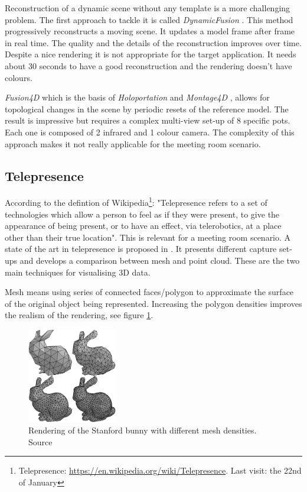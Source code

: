 Reconstruction of a dynamic scene without any template is a more challenging problem. The first approach to tackle it is called \textit{DynamicFusion} \cite{zollhofer_real-time_2014}. This method progressively reconstructs a moving scene. It updates a model frame after frame in real time. The quality and the details of the reconstruction improves over time. Despite a nice rendering it is not appropriate for the target application. It needs about 30 seconds to have a good reconstruction and the rendering doesn't have colours. 

\textit{Fusion4D} \cite{dou_fusion4d:_2016} which is the basis of \textit{Holoportation} \cite{orts-escolano_holoportation_2016} and \textit{Montage4D} \cite{du_montage4d:_2019}, allows for topological changes in the scene by periodic resets of the reference model. The result is impressive but requires a complex multi-view set-up of 8 specific pots. Each one is composed of 2 infrared and 1 colour camera. The complexity of this approach makes it not really applicable for the meeting room scenario.


\subsection{Telepresence}

According to the defintion of Wikipedia\footnote{Telepresence: \url{https://en.wikipedia.org/wiki/Telepresence}. Last visit: the 22nd of January}: "Telepresence refers to a set of technologies which allow a person to feel as if they were present, to give the appearance of being present, or to have an effect, via telerobotics, at a place other than their true location". This is relevant for a meeting room scenario. A state of the art in telepresence is proposed in \cite{smolic_state---art_nodate}. It presents different capture set-ups and develops a comparison between mesh and point cloud. These are the two main techniques for visualising 3D data.

Mesh means using series of connected faces/polygon to approximate the surface of the original object being represented. Increasing the polygon densities improves the realism of the rendering, see figure \ref{figure:bunny_mesh}.

\begin{figure}[H]
    \centering
    \includegraphics[width=0.35\textwidth]{images/state_of_the_art/bunny_mesh.jpg}
    \caption{Rendering of the Stanford bunny with different mesh densities. Source \cite{smolic_state---art_nodate}}
    \label{figure:bunny_mesh}
\end{figure}

